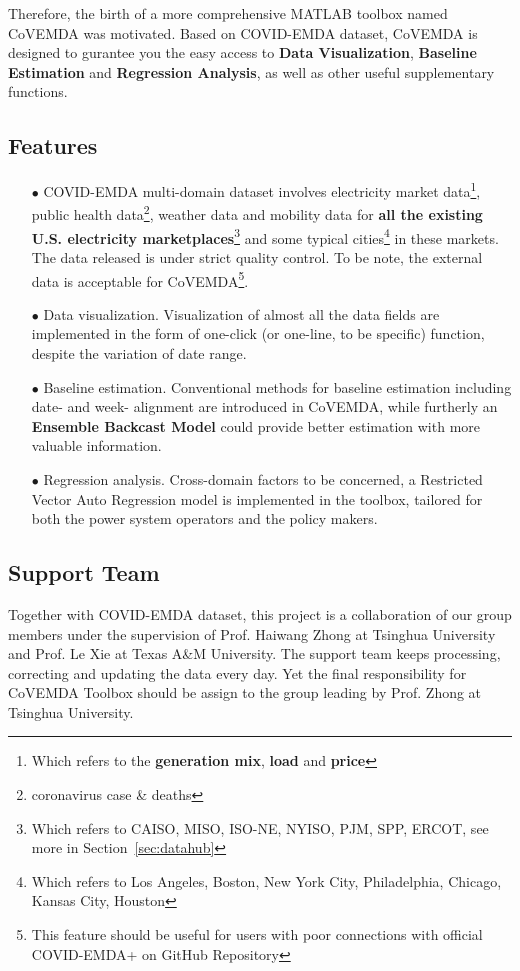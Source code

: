 \documentclass[11pt]{article}
\numberwithin{equation}{section}
\numberwithin{table}{section}
\numberwithin{figure}{section}
\begin{document}
Therefore, the birth of a more comprehensive MATLAB toolbox named CoVEMDA was motivated. Based on COVID-EMDA dataset, CoVEMDA is designed to gurantee you the easy access to \textbf{Data Visualization}, \textbf{Baseline Estimation} and \textbf{Regression Analysis}, as well as other useful supplementary functions.
\subsection{Features}
\begin{itemize}
    \item[$\bullet$] COVID-EMDA multi-domain dataset involves electricity market data\footnote{Which refers to the \textbf{generation mix}, \textbf{load} and \textbf{price}}, public health data\footnote{{coronavirus case \& deaths}}, weather data and mobility data for \textbf{all the existing U.S. electricity marketplaces}\footnote{Which refers to CAISO, MISO, ISO-NE, NYISO, PJM, SPP, ERCOT, see more in Section~\ref{sec:datahub}} and some typical cities\footnote{Which refers to Los Angeles, Boston, New York City, Philadelphia, Chicago, Kansas City, Houston} in these markets. The data released is under strict quality control. To be note, the external data is acceptable for CoVEMDA\footnote{This feature should be useful for users with poor connections with official COVID-EMDA+ on GitHub Repository}.
    \item[$\bullet$] Data visualization. Visualization of almost all the data fields are implemented in the form of one-click (or one-line, to be specific) function, despite the variation of date range.
    \item[$\bullet$] Baseline estimation. Conventional methods for baseline estimation including date- and week- alignment are introduced in CoVEMDA, while furtherly an \textbf{Ensemble Backcast Model} could provide better estimation with more valuable information.
    \item[$\bullet$] Regression analysis. Cross-domain factors to be concerned, a Restricted Vector Auto Regression model is implemented in the toolbox, tailored for both the power system operators and the policy makers.
\end{itemize}


\subsection{Support Team}

Together with COVID-EMDA dataset, this project is a collaboration of our group members under the supervision of Prof. Haiwang Zhong at Tsinghua University and Prof. Le Xie at Texas A\&M University. The support team keeps processing, correcting and updating the data every day. Yet the final responsibility for CoVEMDA Toolbox should be assign to the group leading by Prof. Zhong at Tsinghua University.
\end{document}
